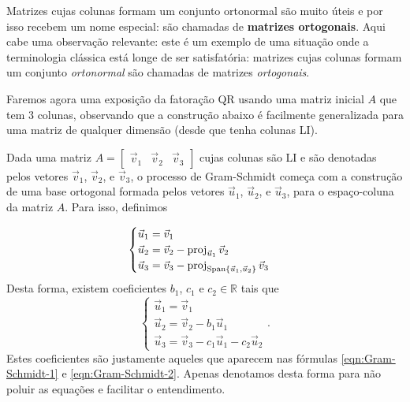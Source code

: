 Matrizes cujas colunas formam um conjunto ortonormal são muito úteis e por isso recebem um nome especial: são chamadas de \textbf{matrizes ortogonais}. Aqui cabe uma observação relevante: este é um exemplo de uma situação onde a terminologia clássica está longe de ser satisfatória: matrizes  cujas colunas formam um conjunto {\it ortonormal} são chamadas de matrizes {\it ortogonais}.

\medskip

Faremos agora uma exposição da fatoração QR usando uma matriz inicial $A$ que tem 3 colunas, observando que a construção abaixo é facilmente generalizada para uma matriz de qualquer dimensão (desde que tenha colunas LI).

Dada uma matriz $A=\begin{bmatrix}
\vec{v}_1 & \vec{v}_2 & \vec{v}_3
\end{bmatrix}$ cujas colunas são LI e são denotadas pelos vetores $\vec{v}_1$, $\vec{v}_2$, e $\vec{v}_3$,
o processo de Gram-Schmidt começa com a construção de uma base ortogonal formada pelos vetores
$\vec{u}_1$, $\vec{u}_2$, e $\vec{u}_3$,
para o espaço-coluna da matriz $A$. Para isso, definimos

\begin{equation}
\begin{cases}
\vec{u}_1 = \vec{v}_1 \\
\vec{u}_2 = \vec{v}_2 - \operatorname{proj}_{\vec{u}_1} \vec{v}_2 \\
\vec{u}_3 = \vec{v}_3 - \operatorname{proj}_{\operatorname{Span}\{\vec{u}_1,\vec{u}_2\}} \vec{v}_3
\end{cases}
\end{equation}
Desta forma, existem coeficientes $b_1$, $c_1$ e $c_2 \in \mathbb{R}$ tais que
\begin{equation}
\begin{cases}
\vec{u}_1 = \vec{v}_1 \\
\vec{u}_2 = \vec{v}_2 - b_1 \vec{u}_1 \\
\vec{u}_3 = \vec{v}_3 - c_1 \vec{u}_1 - c_2 \vec{u}_2
\end{cases}.
\end{equation} Estes coeficientes são justamente aqueles que aparecem nas fórmulas \eqref{eqn:Gram-Schmidt-1} e \eqref{eqn:Gram-Schmidt-2}. Apenas denotamos desta forma para não poluir as equações e facilitar o entendimento.

